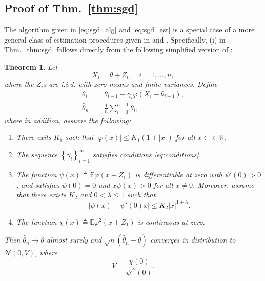 \documentclass[letterpaper, conference,9pt]{IEEEtran}      %
\newtheorem{thm}{\bf{Theorem}}
\begin{document}
\subsection*{Proof of Thm.~\ref{thm:sgd}}
The algorithm given in \eqref{eq:sgd_alg} and \eqref{eq:sgd_est} is a special case of a more general class of estimation procedures given in \cite{polyak1992acceleration} and \cite{polyak1990new}. Specifically, (i) in Thm.~\ref{thm:sgd} follows directly from the following simplified version of \cite[Thm. 4]{polyak1992acceleration}:
\begin{thm}{\cite[Thm. 4]{polyak1992acceleration}} \label{thm:polyak_juditsky}
Let 
\[
X_i = \theta + Z_i,\quad i=1,\ldots,n,
\]
where the $Z_i$s are i.i.d. with zero means and finite variances. Define
\begin{align*}
\theta_i & = \theta_{i-1} + \gamma_i \varphi(X_i - \theta_{i-1}), \\
\widehat{\theta}_n & = \frac{1}{n} \sum_{i=0}^{n-1} \theta_i, 
\end{align*}
where in addition, assume the following: 
\begin{enumerate}
\item[(i)] There exits $K_1$ such that $\left| \varphi(x) \right| \leq K_1(1+|x|)$ for all $x\in \in \mathbb R$.
\item[(ii)] The sequence $\left\{ \gamma_i \right\}_{i=1}^\infty$ satisfies conditions \eqref{eq:conditions}.
\item[(iii)] The function $\psi(x) \triangleq \mathbb E \varphi(x+Z_1)$ is differentiable at zero with $\psi'(0)>0$, and satisfies $\psi(0)=0$ and $x\psi(x) >0$ for all $x\neq 0$.
Moreover, assume that there exists $K_2$ and $0<\lambda \leq 1$ such that
\begin{equation}
\label{eq:Polyak_Juditsky_cond3}
\left| \psi(x) - \psi'(0)x \right|\leq K_2 |x|^{1+\lambda}.
\end{equation}
\item[(iv)] The function 
$\chi(x) \triangleq \mathbb E \varphi^2(x+Z_1)$ is continuous at zero. 
\end{enumerate}
Then $\widehat{\theta}_n \rightarrow \theta$ almost surely and $ \sqrt{n}(\widehat{\theta}_n - \theta)$ converges in distribution to $\mathcal N(0,V)$, where
\[
V = \frac{ \chi(0)} {\psi'^2(0)}. 
\]
\end{thm}
\end{document}
